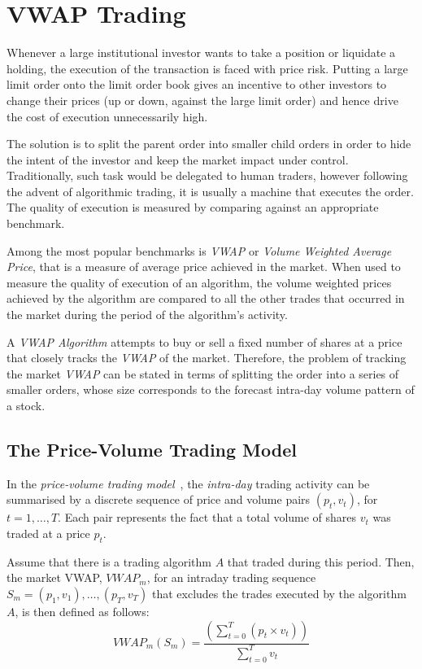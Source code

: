 \section{VWAP Trading}
Whenever a large institutional investor wants to take a position or liquidate a holding, the execution of the transaction is faced with price risk. Putting a large limit order onto the limit order book gives an incentive to other investors to change their prices (up or down, against the large limit order) and hence drive the cost of execution unnecessarily high. 

The solution is to split the parent order into smaller child orders in order to hide the intent of the investor and keep the market impact under control. Traditionally, such task would be delegated to human traders, however following the advent of algorithmic trading, it is usually a machine that executes the order. The quality of execution is measured by comparing against an appropriate benchmark.

Among the most popular benchmarks is \textit{VWAP} or \textit{Volume Weighted Average Price}, that is a measure of average price achieved in the market. When used to measure the quality of execution of an algorithm, the volume weighted prices achieved by the algorithm are compared to all the  other trades that occurred in the market during the period of the algorithm's activity. 

A \textit{VWAP Algorithm} attempts to buy or sell a fixed number of shares at a price that closely tracks the \textit{VWAP} of the market. Therefore, the problem of tracking the market \textit{VWAP} can be stated in terms of splitting the order into a series of smaller orders, whose size corresponds to the forecast intra-day volume pattern of a stock. 

\subsection{The Price-Volume Trading Model}
\label{Chapters/Background/Price-Volume-Trading-Model}
In the \textit{price-volume trading model}~\cite{Kakade2004}, the \textit{intra-day} trading activity can be summarised by a discrete sequence of price and volume pairs $(p_t, v_t)$, for $t=1,\ldots,T$. Each pair represents the fact that a total volume of shares $v_t$ was traded at a price $p_t$. 

Assume that there is a trading algorithm $A$ that traded during this period.  Then, the market VWAP, $VWAP_m$, for an intraday trading sequence $S_m = (p_1, v_1), \ldots, (p_T, v_T)$ that excludes the trades executed by the algorithm $A$, is then defined as follows:
\begin{equation}  
\label{Equation/Market-Vwap}
VWAP_m(S_m) = \frac{\left( \displaystyle\sum\limits_{t=0}^T (p_t \times v_t) \right)}{\displaystyle\sum\limits_{t=0}^T v_t}
\end{equation}

